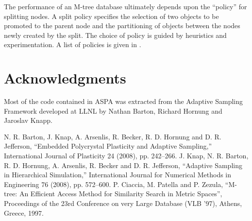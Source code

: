 \documentclass[12pt]{article}
\begin{document}
The performance of an M-tree database ultimately depends upon the
``policy'' for splitting nodes.  A split policy specifies the
selection of two objects to be promoted to the parent node and the
partitioning of objects between the nodes newly created by the split.
The choice of policy is guided by heuristics and experimentation.  A
list of policies is given in \cite{Ciaccia1997}.

\section{Acknowledgments}

Most of the code contained in ASPA was extracted from the Adaptive
Sampling Framework developed at LLNL by Nathan Barton, Richard Hornung and
Jaroslav Knapp.


\begin{thebibliography}{99}
 N. R. Barton, J. Knap, A. Arsenlis, R. Becker,
  R. D. Hornung and D. R. Jefferson, ``Embedded Polycrystal Plasticity
  and Adaptive Sampling,'' International Journal of Plasticity 24
  (2008), pp. 242--266.
 J. Knap, N. R. Barton, R. D. Hornung, A. Arsenlis,
  R. Becker and D. R. Jefferson, ``Adaptive Sampling in Hierarchical
  Simulation,'' International Journal for Numerical Methods in
  Engineering 76 (2008), pp. 572--600.
 P. Ciaccia, M. Patella and P. Zezula, ``M-tree:
  An Efficient Access Method for Similarity Search in Metric Spaces'',
  Proceedings of the 23rd Conference on very Large Database (VLB '97),
  Athens, Greece, 1997.
\end{thebibliography}
\end{document}
